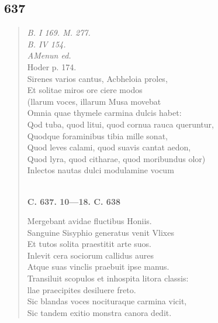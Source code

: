 \documentclass[11pt, a4paper]{report}
\begin{document}
            \subsection*{637}
      \begin{verse}
      \textit{B. I 169. M. 277.} \\ \textit{B. IV 154.} \\ \textit{AMenun ed.} \\ Hoder p. 174. \\ Sirenes varios cantus, Acbheloia proles, \\ Et solitae miros ore ciere modos \\ (llarum voces, illarum Musa movebat \\ Omnia quae thymele carmina dulcis habet: \\ Qod tuba, quod litui, quod cornua rauca queruntur, \\ Quodque foraminibus tibia mille sonat, \\ Quod leves calami, quod suavis cantat aedon, \\ Quod lyra, quod citharae, quod moribundus olor) \\ Inlectos nautas dulci modulamine vocum \\ 
        ﻿\pagebreak 
     \marginpar{[104]} \begin{center} \textbf{C. 637. 10—18. C. 638} \end{center}Mergebant avidae fluctibus Honiis. \\ Sanguine Sisyphio generatus venit Vlixes \\ Et tutos solita praestitit arte suos. \\ Inlevit cera sociorum callidus aures \\ Atque suas vinclis praebuit ipse manus. \\ Transiluit scopulos et inhospita litora classis: \\ llae praecipites desiluere freto. \\ Sic blandas voces nocituraque carmina vicit, \\ Sic tandem exitio monstra canora dedit. \\ 
      \end{verse}
  
\end{document}

